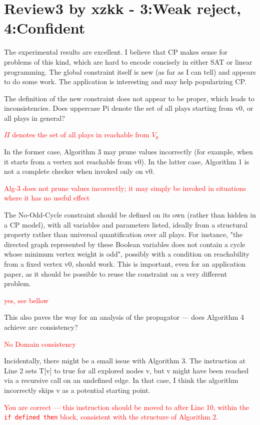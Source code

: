\documentclass{article}
\begin{document}
\section*{Review3 by xzkk - 3:Weak reject,  4:Confident }
The experimental results are excellent. I believe that CP makes sense for problems of this kind, which are hard to encode concisely in either SAT or linear programming. The global constraint itself is new (as far as I can tell) and appears to do some work. The application is interesting and may help popularizing CP.

The definition of the new constraint does not appear to be proper, which leads to inconsistencies. Does uppercase Pi denote the set of all plays starting from v0, or all plays in general?

\textcolor{red}{$\Pi$ denotes the set of all plays in reachable from $V_0$}

In the former case, Algorithm 3 may prune values incorrectly (for example, when it starts from a vertex not reachable from v0). In the latter case, Algorithm 1 is not a complete checker when invoked only on v0. 

\textcolor{red}{Alg-3 does not prune values incorrectly; it may simply be invoked in situations where it has no useful effect}

The No-Odd-Cycle constraint should be defined on its own (rather than hidden in a CP model), with all variables and parameters listed, ideally from a structural property rather than universal quantification over all plays. For instance, "the directed graph represented by these Boolean variables does not contain a cycle whose minimum vertex weight is odd", possibly with a condition on reachability from a fixed vertex v0, should work. This is important, even for an application paper, as it should be possible to reuse the constraint on a very different problem. 

\textcolor{red}{yes, see bellow}

This also paves the way for an analysis of the propagator — does Algorithm 4 achieve arc consistency?

\textcolor{red}{No Domain consistency}

Incidentally, there might be a small issue with Algorithm 3. The instruction at Line 2 sets T[v] to true for all explored nodes v, but v might have been reached via a recursive call on an undefined edge. In that case, I think the algorithm incorrectly skips v as a potential starting point.

\textcolor{red}{You are correct — this instruction should be moved to after Line 10, within the \texttt{if defined then} block, consistent with the structure of Algorithm 2.}
\end{document}
